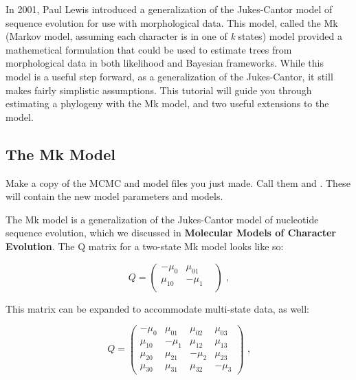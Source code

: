 In 2001, Paul Lewis introduced a generalization of the Jukes-Cantor model of sequence evolution for use with morphological data.
This model, called the Mk (Markov model, assuming each character is in one of \textit{k} states) model provided a mathemetical formulation that could be used to estimate trees from morphological data in both likelihood and Bayesian frameworks. 
While this model is a useful step forward, as a generalization of the Jukes-Cantor, it still makes fairly simplistic assumptions.
This tutorial will guide you through estimating a phylogeny with the Mk model, and two useful extensions to the model. \par

\subsection{The Mk Model}
{\begin{framed}
Make a copy of the MCMC and model files you just made. 
Call them  and . 
These will contain the new model parameters and models. \par 
\end{framed}}

The Mk model is a generalization of the Jukes-Cantor model of nucleotide sequence evolution, which we discussed in \textbf{Molecular Models of Character Evolution}. 
The Q matrix for a two-state Mk model looks like so:

\begin{equation*}
Q = \begin{pmatrix} -\mu_0 & \mu_{01} \\
\mu_{10} & -\mu_1  &\\
\end{pmatrix} \mbox{  ,}
\end{equation*}

This matrix can be expanded to accommodate multi-state data, as well:

\begin{equation*}
Q = \begin{pmatrix} -\mu_0 & \mu_{01} & \mu_{02} & \mu_{03} \\
\mu_{10} & -\mu_1  & \mu_{12} & \mu_{13} \\
\mu_{20} & \mu_{21} & -\mu_2  & \mu_{23} \\
\mu_{30} & \mu_{31} & \mu_{32} & -\mu_3 
\end{pmatrix} \mbox{  ,}
\end{equation*}

